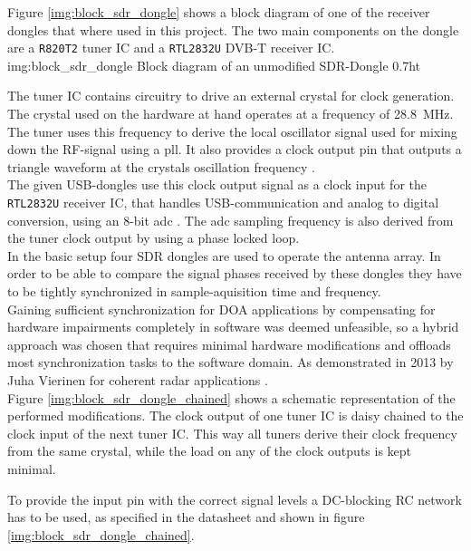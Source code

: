 Figure \ref{img:block_sdr_dongle} shows a block
diagram of one of the receiver dongles that where used
in this project.
The two main components on the dongle are a
\texttt{R820T2} tuner IC
and a \texttt{RTL2832U} DVB-T receiver IC. \\

             {img:block_sdr_dongle}
             {Block diagram of an unmodified SDR-Dongle}
             {0.7}{ht}

The tuner IC contains circuitry to drive an
external crystal for clock generation.
The crystal used on the hardware at hand
operates at a frequency of \SI{28.8}{\mega\hertz}.
The tuner uses this frequency to derive the
local oscillator signal used for mixing down
the RF-signal using a \gls{pll}.
It also provides a clock output pin that
outputs a triangle waveform at the crystals
oscillation frequency \cite{r820t2datasheet}. \\

The given USB-dongles use this clock output signal
as a clock input for the \texttt{RTL2832U}
receiver IC, that handles USB-communication
and analog to digital conversion, using an 8-bit \gls{adc} .
The \gls{adc} sampling frequency is also derived from
the tuner clock output by using a phase locked loop. \\

In the basic setup four SDR dongles are used
to operate the antenna array.
In order to be able to compare the signal phases
received by these dongles they have to be tightly
synchronized in sample-aquisition time and frequency. \\

Gaining sufficient synchronization for DOA applications
by compensating for hardware impairments completely
in software was deemed unfeasible, so a hybrid
approach was chosen that requires minimal hardware
modifications and offloads most synchronization tasks
to the software domain.
As demonstrated in 2013 by Juha Vierinen for
coherent radar applications \cite{rtlradar}. \\

Figure \ref{img:block_sdr_dongle_chained} shows
a schematic representation of the performed modifications.
The clock output of one tuner IC is daisy chained to
the clock input of the next tuner IC.
This way all tuners derive their clock frequency
from the same crystal, while the load on any of
the clock outputs is kept minimal.

To provide the input pin with the correct signal
levels a DC-blocking RC network has to be used,
as specified in the datasheet \cite{r820t2datasheet}
and shown in figure \ref{img:block_sdr_dongle_chained}.

